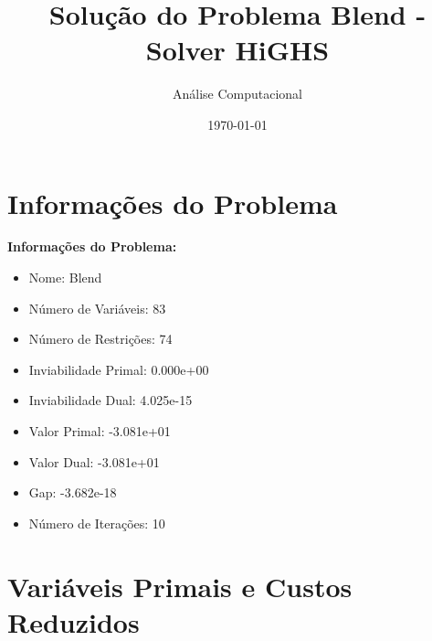 \documentclass[12pt]{article}
\title{Solução do Problema Blend - Solver HiGHS}
\author{Análise Computacional}
\date{\today}
\begin{document}
\maketitle

\section{Informações do Problema}

\textbf{Informações do Problema:}
\begin{itemize}
\item Nome: Blend
\item Número de Variáveis: 83
\item Número de Restrições: 74
\item Inviabilidade Primal: 0.000e+00
\item Inviabilidade Dual: 4.025e-15
\item Valor Primal: -3.081e+01
\item Valor Dual: -3.081e+01
\item Gap: -3.682e-18
\item Número de Iterações: 10
\end{itemize}


\section{Variáveis Primais e Custos Reduzidos}
\end{document}
